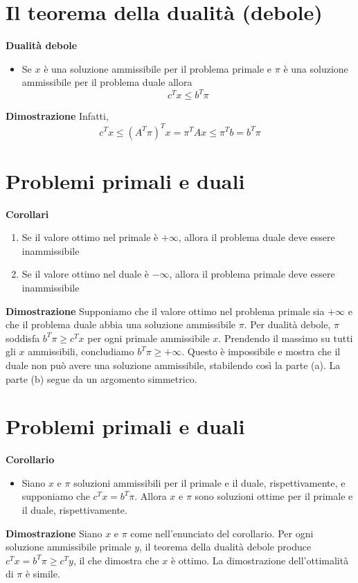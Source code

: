 \documentclass[a4paper, 11pt]{article}
\begin{document}
        \section*{Il teorema della dualità (debole)}
        \textbf{Dualità debole}
        \begin{itemize}
            \item Se $x$ è una soluzione ammissibile per il problema primale e $\pi$ è una soluzione ammissibile per il problema duale allora
            \begin{equation*}
                c^T x \leq b^T \pi
            \end{equation*}
        \end{itemize}
        \textbf{Dimostrazione} Infatti,
        \begin{equation*}
            c^T x \leq (A^T \pi)^T x = \pi^T A x \leq \pi^T b = b^T \pi
        \end{equation*}
        
        \section*{Problemi primali e duali}
        \textbf{Corollari}
        \begin{enumerate}
            \item Se il valore ottimo nel primale è $+\infty$, allora il problema duale deve essere inammissibile
            \item Se il valore ottimo nel duale è $-\infty$, allora il problema primale deve essere inammissibile
        \end{enumerate}
        \textbf{Dimostrazione} Supponiamo che il valore ottimo nel problema primale sia $+\infty$ e che il problema duale abbia una soluzione ammissibile $\pi$. Per dualità debole, $\pi$ soddisfa $b^T \pi \geq c^T x$ per ogni primale ammissibile $x$. Prendendo il massimo su tutti gli $x$ ammissibili, concludiamo $b^T \pi \geq +\infty$. Questo è impossibile e mostra che il duale non può avere una soluzione ammissibile, stabilendo così la parte (a). La parte (b) segue da un argomento simmetrico.
        
        \section*{Problemi primali e duali}
        \textbf{Corollario}
        \begin{itemize}
            \item Siano $x$ e $\pi$ soluzioni ammissibili per il primale e il duale, rispettivamente, e supponiamo che $c^T x = b^T \pi$. Allora $x$ e $\pi$ sono soluzioni ottime per il primale e il duale, rispettivamente.
        \end{itemize}
        \textbf{Dimostrazione} Siano $x$ e $\pi$ come nell'enunciato del corollario. Per ogni soluzione ammissibile primale $y$, il teorema della dualità debole produce $c^T x = b^T \pi \geq c^T y$, il che dimostra che $x$ è ottimo. La dimostrazione dell'ottimalità di $\pi$ è simile.
        
\end{document}
